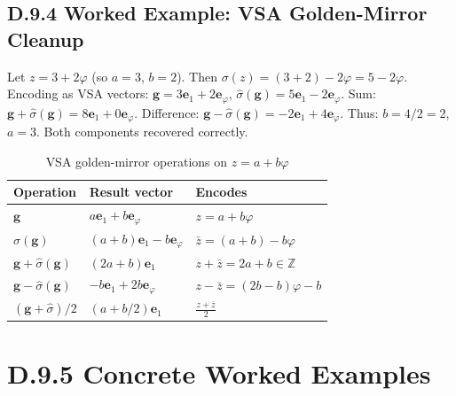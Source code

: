 \subsection*{D.9.4  Worked Example: VSA Golden-Mirror Cleanup}

Let $z = 3 + 2\varphi$ (so $a=3$, $b=2$).
Then $\sigma(z) = (3+2)-2\varphi = 5-2\varphi$.
Encoding as VSA vectors:
$\mathbf{g} = 3\mathbf{e}_1 + 2\mathbf{e}_\varphi$,
$\hat{\sigma}(\mathbf{g}) = 5\mathbf{e}_1 - 2\mathbf{e}_\varphi$.
Sum: $\mathbf{g} + \hat{\sigma}(\mathbf{g}) = 8\mathbf{e}_1 + 0\mathbf{e}_\varphi$.
Difference: $\mathbf{g} - \hat{\sigma}(\mathbf{g}) = -2\mathbf{e}_1 + 4\mathbf{e}_\varphi$.
Thus: $b = 4/2 = 2$, $a = 3$. Both components recovered correctly.

\begin{table}[h]
\centering
\caption{VSA golden-mirror operations on $z = a+b\varphi$}
\begin{tabular}{lll}
\toprule
Operation & Result vector & Encodes \\
\midrule
$\mathbf{g}$ & $a\mathbf{e}_1 + b\mathbf{e}_\varphi$ & $z = a+b\varphi$ \\
$\hat{\sigma}(\mathbf{g})$ & $(a+b)\mathbf{e}_1 - b\mathbf{e}_\varphi$ & $\bar{z}=(a+b)-b\varphi$ \\
$\mathbf{g}+\hat{\sigma}(\mathbf{g})$ & $(2a+b)\mathbf{e}_1$ & $z+\bar{z} = 2a+b \in\mathbb{Z}$ \\
$\mathbf{g}-\hat{\sigma}(\mathbf{g})$ & $-b\mathbf{e}_1+2b\mathbf{e}_\varphi$ & $z-\bar{z} = (2b-b)\varphi-b$ \\
$(\mathbf{g}+\hat{\sigma})/2$ & $(a+b/2)\mathbf{e}_1$ & $\tfrac{z+\bar{z}}{2}$ \\
\bottomrule
\end{tabular}
\end{table}

\section*{D.9.5  Concrete Worked Examples}

